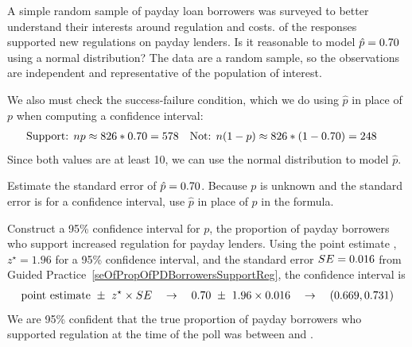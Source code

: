 \begin{examplewrap}
\begin{nexample}{A simple random sample of \paydayN{}
    payday loan borrowers was surveyed to better
    understand their interests around regulation and costs.
    \paydayRegPerc{} of the responses supported new
    regulations on payday lenders.
    Is it reasonable to model $\hat{p} = 0.70{}$
    using a normal distribution?}
  The data are a random sample, so the observations are
  independent and representative of the population of
  interest.

  We also must check the success-failure condition,
  which we do using $\hat{p}$ in place
  of $p$ when computing a confidence interval:
  \begin{align*}
  \text{Support: }
      n p & \approx 826{} * 0.70{}
      = 578
  &\text{Not: }
      n (1 - p) & \approx 826{} * (1 - 0.70{})
      = 248
  \end{align*}
  Since both values are at least 10, we can use the normal
  distribution to model $\hat{p}$.
\end{nexample}
\end{examplewrap}




\begin{exercisewrap}
\begin{nexercise} \label{seOfPropOfPDBorrowersSupportReg}
Estimate the standard error of $\hat{p} = 0.70{}$.
Because $p$ is unknown and the standard error is for
a confidence interval, use $\hat{p}$ in place of $p$
in the formula.\footnotemark
\end{nexercise}
\end{exercisewrap}

\begin{examplewrap}
\begin{nexample}{Construct a 95\% confidence interval for $p$,
    the proportion of payday borrowers who support increased
    regulation for payday lenders.}
  Using
  the point estimate \paydayRegProp{},
  $z^{\star} = 1.96$ for a 95\% confidence interval,
  and
  the standard error $SE = 0.016{}$ from
  Guided Practice~\ref{seOfPropOfPDBorrowersSupportReg},
  the confidence interval is
  \begin{eqnarray*}
  \text{point estimate} \ \pm\ z^{\star} \times SE
      \quad\to\quad
      0.70{} \ \pm\ 1.96 \times 0.016{}
      \quad\to\quad
      (0.669{}, 0.731{})
  \end{eqnarray*}
  We are 95\% confident that the true proportion of
  payday borrowers who supported regulation at the time
  of the poll was between \paydayRegLower{} and
  \paydayRegUpper{}.
\end{nexample}
\end{examplewrap}

